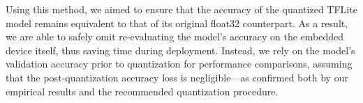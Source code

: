 Using this method, we aimed to ensure that the accuracy of the quantized TFLite model remains equivalent to that of its original float32 counterpart. As a result, we are able to safely omit re-evaluating the model's accuracy on the embedded device itself, thus saving time during deployment. Instead, we rely on the model's validation accuracy prior to quantization for performance comparisons, assuming that the post-quantization accuracy loss is negligible—as confirmed both by our empirical results and the recommended quantization procedure.